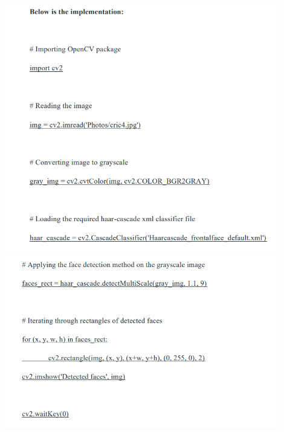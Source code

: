 \includegraphics [width=0.9\textwidth]{pic.png}\\
\includegraphics[width=0.9\textwidth]{pro.png}
\newpage
